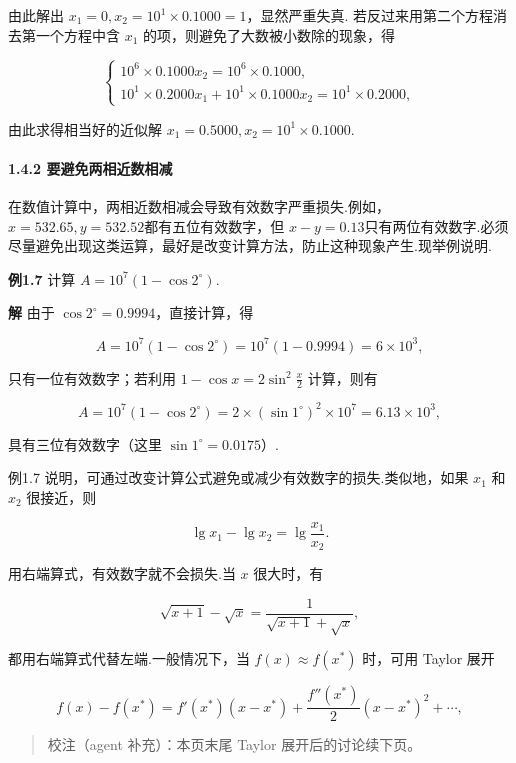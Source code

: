 \documentclass[
  10pt,
  a4paper,
]{article}
\begin{document}
由此解出 \(x_1=0, x_2=10^1 \times 0.1000=1\)，显然严重失真.
若反过来用第二个方程消去第一个方程中含 \(x_1\)
的项，则避免了大数被小数除的现象，得

\[
\begin{cases} 10^6 \times 0.1000x_2 = 10^6 \times 0.1000, \\ 10^1 \times 0.2000x_1 + 10^1 \times 0.1000x_2 = 10^1 \times 0.2000, \end{cases}
\]

由此求得相当好的近似解 \(x_1=0.5000, x_2=10^1 \times 0.1000\).

\paragraph{1.4.2
要避免两相近数相减}\label{ux8981ux907fux514dux4e24ux76f8ux8fd1ux6570ux76f8ux51cf}

在数值计算中，两相近数相减会导致有效数字严重损失.例如，\(x=532.65, y=532.52\)都有五位有效数字，但
\(x-y=0.13\)只有两位有效数字.必须尽量避免出现这类运算，最好是改变计算方法，防止这种现象产生.现举例说明.

\textbf{例1.7} 计算 \(A=10^7(1-\cos 2^\circ)\).

\textbf{解} 由于 \(\cos 2^\circ=0.9994\)，直接计算，得

\[
A=10^7(1-\cos 2^\circ)=10^7(1-0.9994)=6 \times 10^3,
\]

只有一位有效数字；若利用 \(1-\cos x=2\sin^2\frac{x}{2}\) 计算，则有

\[
A=10^7(1-\cos 2^\circ)=2 \times (\sin 1^\circ)^2 \times 10^7=6.13 \times 10^3,
\]

具有三位有效数字（这里 \(\sin 1^\circ=0.0175\)）.

例1.7 说明，可通过改变计算公式避免或减少有效数字的损失.类似地，如果
\(x_1\) 和 \(x_2\) 很接近，则

\[
\lg x_1-\lg x_2=\lg \frac{x_1}{x_2}.
\]

用右端算式，有效数字就不会损失.当 \(x\) 很大时，有

\[
\sqrt{x+1}-\sqrt{x}=\frac{1}{\sqrt{x+1}+\sqrt{x}},
\]

都用右端算式代替左端.一般情况下，当 \(f(x)\approx f(x^*)\) 时，可用
Taylor 展开

\[
f(x)-f(x^*)=f'(x^*) (x-x^*)+\frac{f''(x^*)}{2} (x-x^*)^2+\cdots,
\]

\begin{quote}
校注（agent 补充）：本页末尾 Taylor 展开后的讨论续下页。
\end{quote}
\end{document}
